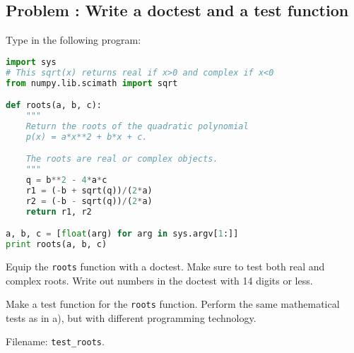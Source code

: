 \documentclass[graybox,sectrefs,envcountresetchap,open=right,final]{svmonodo}
\newenvironment{doconceexercise}{}{}
\newcounter{doconceexercisecounter}
\begin{document}
\begin{doconceexercise}

\subsection*{Problem \thedoconceexercisecounter: Write a doctest and a test function}

\label{softeng1:exer:doctest1}

Type in the following program:

\begin{lstlisting}[language=Python,style=blue1bar_bluegreen]
import sys
# This sqrt(x) returns real if x>0 and complex if x<0
from numpy.lib.scimath import sqrt

def roots(a, b, c):
    """
    Return the roots of the quadratic polynomial
    p(x) = a*x**2 + b*x + c.

    The roots are real or complex objects.
    """
    q = b**2 - 4*a*c
    r1 = (-b + sqrt(q))/(2*a)
    r2 = (-b - sqrt(q))/(2*a)
    return r1, r2

a, b, c = [float(arg) for arg in sys.argv[1:]]
print roots(a, b, c)
\end{lstlisting}


Equip the \texttt{roots} function with a doctest.
Make sure to test both real and complex roots.
Write out numbers in the doctest with 14 digits or less.

Make a test function for the \texttt{roots} function. Perform the
same mathematical tests as in a), but with different
programming technology.

\noindent Filename: \Verb!test_roots!.

\end{doconceexercise}
\end{document}
